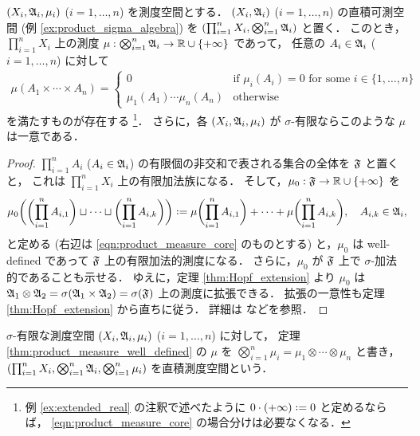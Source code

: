 \begin{theorem}\label{thm:product_measure_well_defined}
    $(X_i,\mathfrak{A}_i,\mu_i)$ ($i=1,\ldots,n$) を測度空間とする．
    $(X_i,\mathfrak{A}_i)$ ($i=1,\ldots,n$) の直積可測空間 (例 \ref{ex:product_sigma_algebra}) を $(\prod_{i=1}^nX_i,\bigotimes_{i=1}^n\mathfrak{A}_i)$ と置く．
    このとき，$\prod_{i=1}^nX_i$ 上の測度 $\mu:\bigotimes_{i=1}^n\mathfrak{A}_i\to\mathbb{R}\cup\{+\infty\}$ であって，
    任意の $A_i\in\mathfrak{A}_i$ ($i=1,\ldots,n$) に対して
    \begin{align}
        \mu(A_1\times\cdots\times A_n)=\begin{cases}
            0&\text{if $\mu_i(A_i)=0$ for some $i\in\{1,\ldots,n\}$}\\
            \mu_1(A_1)\cdots\mu_n(A_n)&\text{otherwise}
        \end{cases}
        \label{eqn:product_measure_core}
    \end{align}
    を満たすものが存在する
    \footnote{例 \ref{ex:extended_real} の注釈で述べたように $0\cdot(+\infty)\defeq0$ と定めるならば，
    \eqref{eqn:product_measure_core} の場合分けは必要なくなる．}．
    さらに，各 $(X_i,\mathfrak{A}_i,\mu_i)$ が $\sigma$-有限ならこのような $\mu$ は一意である．
\end{theorem}

\begin{proof}
    $\prod_{i=1}^nA_i$ ($A_i\in\mathfrak{A}_i$) の有限個の非交和で表される集合の全体を $\mathfrak{F}$ と置くと，
    これは $\prod_{i=1}^nX_i$ 上の有限加法族になる．
    そして，$\mu_0:\mathfrak{F}\to\mathbb{R}\cup\{+\infty\}$ を
    \begin{align*}
        \mu_0\biggl(\biggl(\prod_{i=1}^nA_{i,1}\biggr)\sqcup\cdots\sqcup\biggl(\prod_{i=1}^nA_{i,k}\biggr)\biggr)
        \defeq\mu\biggl(\prod_{i=1}^nA_{i,1}\biggr)+\cdots+\mu\biggl(\prod_{i=1}^nA_{i,k}\biggr),\quad
        A_{i,k}\in\Afrak_i,
    \end{align*}
    と定める (右辺は \eqref{eqn:product_measure_core} のものとする) と，$\mu_0$ は well-defined であって
    $\mathfrak{F}$ 上の有限加法的測度になる．
    さらに，$\mu_0$ が $\mathfrak{F}$ 上で $\sigma$-加法的であることも示せる．
    ゆえに，定理 \ref{thm:Hopf_extension} より $\mu_0$ は
    $\mathfrak{A}_1\otimes\mathfrak{A}_2=\sigma(\mathfrak{A}_1\times\mathfrak{A}_2)=\sigma(\mathfrak{F})$ 上の測度に拡張できる．
    拡張の一意性も定理 \ref{thm:Hopf_extension} から直ちに従う．
    詳細は \cite[\S2.5]{Fo99} などを参照．
\end{proof}

\begin{definition}
    $\sigma$-有限な測度空間 $(X_i,\mathfrak{A}_i,\mu_i)$ ($i=1,\ldots,n$) に対して，
    定理 \ref{thm:product_measure_well_defined} の $\mu$ を $\bigotimes_{i=1}^n\mu_i=\mu_1\otimes\cdots\otimes\mu_n$ と書き，
    $(\prod_{i=1}^nX_i,\bigotimes_{i=1}^n\mathfrak{A}_i,\bigotimes_{i=1}^n\mu_i)$ を直積測度空間という．
\end{definition}

